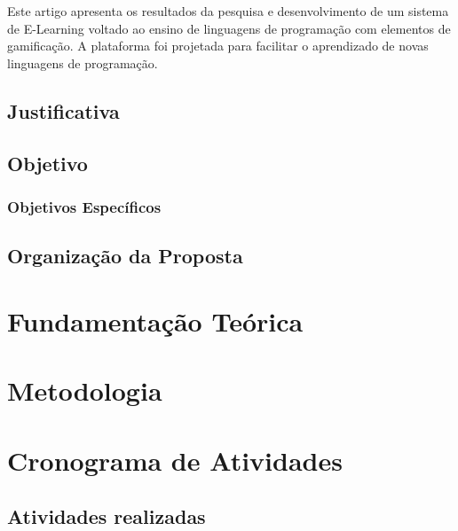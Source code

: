 \documentclass[
	12pt,				%
	oneside,			%
	a4paper,			%
	english,			%
	french,				%
	spanish,			%
	brazil				%
	]{abntex2}
\begin{document}
Este artigo apresenta os resultados da pesquisa e desenvolvimento de um
sistema de E-Learning voltado ao ensino de linguagens de programação com
elementos de gamificação. A plataforma foi projetada para facilitar o
aprendizado de novas linguagens de programação.

\hypertarget{justificativa}{%
\section{Justificativa}\label{justificativa}}

\hypertarget{objetivo}{%
\section{Objetivo}\label{objetivo}}

\hypertarget{objetivos-especuxedficos}{%
\subsection{Objetivos Específicos}\label{objetivos-especuxedficos}}

\hypertarget{organizauxe7uxe3o-da-proposta}{%
\section{Organização da Proposta}\label{organizauxe7uxe3o-da-proposta}}

\hypertarget{fundamentauxe7uxe3o-teuxf3rica}{%
\chapter{Fundamentação Teórica}\label{fundamentauxe7uxe3o-teuxf3rica}}

\hypertarget{metodologia}{%
\chapter{Metodologia}\label{metodologia}}

\hypertarget{cronograma-de-atividades}{%
\chapter{Cronograma de Atividades}\label{cronograma-de-atividades}}

\hypertarget{atividades-realizadas}{%
\section{Atividades realizadas}\label{atividades-realizadas}}
\end{document}
